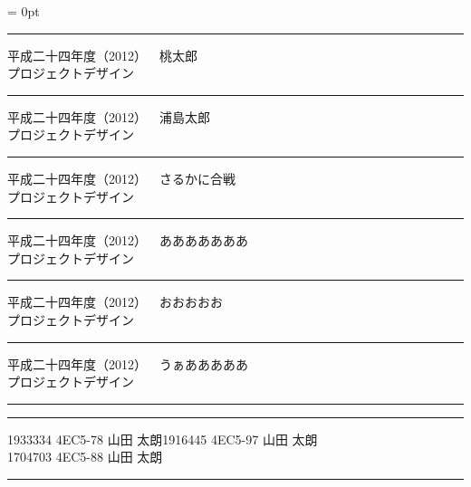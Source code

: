 \documentclass[a4paper,twocolumn,dvipdfmx]{tarticle}
\begin{document}
\parindent = 0pt
 \bf 
\hrule\vspace{1mm}
平成二十四年度（2012）~~桃太郎\\   %
プロジェクトデザイン  \vspace{1mm}
\hrule
\par\vspace{1mm}
平成二十四年度（2012）~~浦島太郎\\   %
プロジェクトデザイン  \vspace{1mm}
\hrule
\par\vspace{1mm}
平成二十四年度（2012）~~さるかに合戦\\   %
プロジェクトデザイン  \vspace{1mm}
\hrule
\par\vspace{1mm}
平成二十四年度（2012）~~あああああああ\\   %
プロジェクトデザイン  \vspace{1mm}
\hrule
\par\vspace{1mm}
平成二十四年度（2012）~~おおおおお\\   %
プロジェクトデザイン  \vspace{1mm}
\hrule
\par\vspace{1mm}
平成二十四年度（2012）~~うぁあああああ\\   %
プロジェクトデザイン  \vspace{1mm}
\hrule
\par\vspace{1mm}
\newpage
\hrule
\vspace{1mm}
\hspace{1cm}1933334 4EC5-78 山田 太朗\hspace{1cm}1916445 4EC5-97 山田 太朗\\ %
\hspace{1cm}1704703 4EC5-88 山田 太朗\vspace{1mm}
\hrule\par\vspace{1mm}
\end{document}

